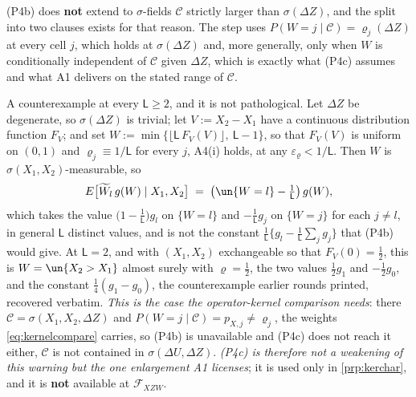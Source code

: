 \begin{remark}\label{rem:pbinaryscope}
\textup{(P4b)} does \textbf{not} extend to $\sigma$-fields $\mathcal C$ strictly larger than
$\sigma(\Delta Z)$, and the split into two clauses exists for that reason. The step uses
$P(W=j\mid\mathcal C)=\varrho_j(\Delta Z)$ at every cell $j$, which holds at $\sigma(\Delta Z)$ and, more
generally, only when $W$ is conditionally independent of $\mathcal C$ given $\Delta Z$, which is
exactly what \textup{(P4c)} assumes and what A1 delivers on the stated range of $\mathcal C$.

A counterexample at every $\mathsf L\ge2$, and it is not pathological. Let $\Delta Z$ be
degenerate, so $\sigma(\Delta Z)$ is trivial; let $V:=X_2-X_1$ have a continuous distribution function
$F_V$; and set $W:=\min\big\{\lfloor\mathsf L\,F_V(V)\rfloor,\ \mathsf L-1\big\}$, so that
$F_V(V)$ is uniform on $(0,1)$ and $\varrho_j\equiv1/\mathsf L$ for every $j$, A4(i) holds, at any
$\varepsilon_\varrho<1/\mathsf L$. Then $W$ is $\sigma(X_1,X_2)$-measurable, so
\[
E\big[\widetilde W_l\,g(W)\mid X_1,X_2\big]\;=\;\big(\un\{W=l\}-\tfrac1{\mathsf L}\big)\,g(W),
\]
which takes the value $\big(1-\tfrac1{\mathsf L}\big)g_l$ on $\{W=l\}$ and $-\tfrac1{\mathsf L}g_j$ on
$\{W=j\}$ for each $j\ne l$, in general $\mathsf L$ distinct values, and is not the constant
$\tfrac1{\mathsf L}\big\{g_l-\tfrac1{\mathsf L}\sum_jg_j\big\}$ that \textup{(P4b)} would give.
At $\mathsf L=2$, and with $(X_1,X_2)$ exchangeable so that $F_V(0)=\tfrac12$, this is
$W=\un\{X_2>X_1\}$ almost surely with $\varrho=\tfrac12$, the two values $\tfrac12g_1$ and
$-\tfrac12g_0$, and the
constant $\tfrac14(g_1-g_0)$, the counterexample earlier rounds printed, recovered verbatim.
\emph{This is the case the operator-kernel comparison needs}: there
$\mathcal C=\sigma(X_1,X_2,\Delta Z)$ and $P(W=j\mid\mathcal C)=p_{X,j}\ne\varrho_j$, the weights
\eqref{eq:kernelcompare} carries, so \textup{(P4b)} is
unavailable and \textup{(P4c)} does not reach it either, $\mathcal C$ is not contained in
$\sigma(\Delta U,\Delta Z)$. \emph{\textup{(P4c)} is therefore not a weakening of this warning but the one
enlargement A1 licenses}; it is used only in \cref{prp:kerchar}, and it is \textbf{not} available at
$\mathcal F_{XZW}$.
\end{remark}

